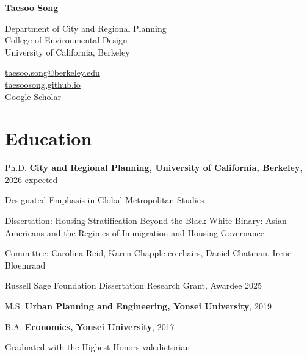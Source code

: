 \documentclass[10pt,letterpaper]{article}
\newcommand{\listitemspace}{0.25em}
\renewenvironment{itemize}
{\begin{list}{}{\setlength{\leftmargin}{1em}
\setlength{\parskip}{0em}
\setlength{\itemsep}{\listitemspace}
\setlength{\parsep}{\listitemspace}}}
{\end{list}}
\newcommand{\namefont}[1]{{\normalfont\bfseries\Huge #1}}
\begin{document}
\raggedright

\namefont{Taesoo Song}

\vspace{0.25\baselineskip}
\titlerule[0.8pt]
\vspace{0.6\baselineskip}

\begin{minipage}[t]{0.66\textwidth}
Department of City and Regional Planning\\
College of Environmental Design\\
University of California, Berkeley
\end{minipage}
\begin{minipage}[t]{0.33\textwidth}
\raggedleft
\href{mailto:taesoo.song@berkeley.edu}{taesoo.song@berkeley.edu}\\
\href{https://taesoosong.github.io}{taesoosong.github.io}\\
\href{https://scholar.google.com/citations?user=xM5Rc-EAAAAJ}{Google Scholar}
\end{minipage}

\section{Education}

\begin{tablist}
  \item[Ph.D.] \tab{}\textbf{City and Regional Planning, University of California, Berkeley}, 2026 expected
    \begin{itemize}
      \item Designated Emphasis in Global Metropolitan Studies
      \item Dissertation: Housing Stratification Beyond the Black White Binary: Asian Americans and the Regimes of Immigration and Housing Governance
      \item Committee: Carolina Reid, Karen Chapple co chairs, Daniel Chatman, Irene Bloemraad
      \item Russell Sage Foundation Dissertation Research Grant, Awardee 2025
    \end{itemize}

  \item[M.S.] \tab{}\textbf{Urban Planning and Engineering, Yonsei University}, 2019

  \item[B.A.] \tab{}\textbf{Economics, Yonsei University}, 2017
    \begin{itemize}
      \item Graduated with the Highest Honors valedictorian
    \end{itemize}
\end{tablist}
\end{document}
